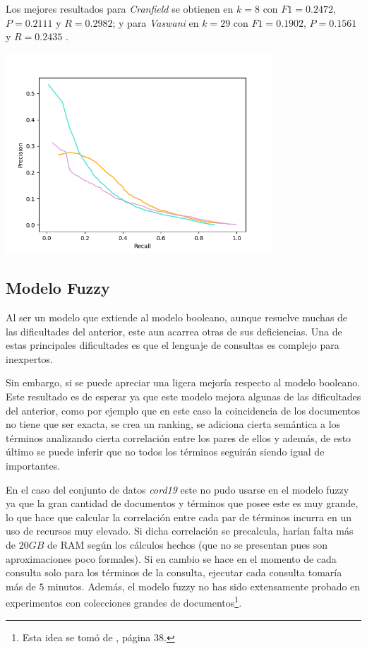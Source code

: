 \documentclass{llncs}
\begin{document}
    Los mejores resultados para \emph{Cranfield} se obtienen en $k = 8$ con $F1 = 0.2472$, $P = 0.2111$ y $R = 0.2982$; y para \emph{Vaswani} en $k = 29$ con $F1 = 0.1902$, $P = 0.1561$ y $R = 0.2435$ .

    \begin{center}
        \includegraphics[width=10cm]{PR_plot(all).png}    
    \end{center}

	\subsection{Modelo Fuzzy}
	
	Al ser un modelo que extiende al modelo booleano, aunque resuelve muchas de las dificultades del anterior, este aun acarrea otras de sus deficiencias. Una de estas principales dificultades es que el lenguaje de consultas es complejo para inexpertos.
	
	Sin embargo, si se puede apreciar una ligera mejor\'ia respecto al modelo booleano. Este resultado es de esperar ya que este modelo mejora algunas de las dificultades del anterior, como por ejemplo que en este caso la coincidencia de los documentos no tiene que ser exacta, se crea un ranking, se adiciona cierta sem\'antica a los t\'erminos analizando cierta correlaci\'on entre los pares de ellos y adem\'as, de esto \'ultimo se puede inferir que no todos los t\'erminos seguir\'an siendo igual de importantes.
	 
	En el caso del conjunto de datos \emph{cord19} este no pudo usarse en el modelo fuzzy ya que la gran cantidad de documentos y t\'erminos que posee este es muy grande, lo que hace que calcular la correlaci\'on entre cada par de t\'erminos incurra en un uso de recursos muy elevado. Si dicha correlaci\'on se precalcula, har\'ian falta m\'as de $20 GB$ de RAM seg\'un los c\'alculos hechos (que no se presentan pues son aproximaciones poco formales). Si en cambio se hace en el momento de cada consulta solo para los t\'erminos de la consulta, ejecutar cada consulta tomar\'ia m\'as de $5$ minutos. Adem\'as, el modelo fuzzy no has sido extensamente probado en experimentos con colecciones grandes de documentos\footnote{Esta idea se tom\'o de \cite{B2}, p\'agina $38$.}.
	
\end{document}
